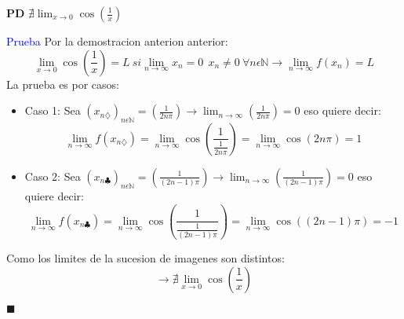 \documentclass{article}
\theoremstyle{mytheoremstyle}
\theoremstyle{mytheoremstyle}
\theoremstyle{myproblemstyle}
\begin{document}
\begin{itemize}
        \medskip
        $\mathbf{P} \mathbf{D}$
        \medskip
        $\nexists \lim_{x \to 0} \cos(\frac{1}{x})$
        
        
        \medskip
        {\textcolor{blue}{Prueba}} 
        \medskip
Por la demostracion anterion anterior:
\begin{equation}
 \lim_{x \to 0}\cos(\frac{1}{x})=\textit{L} \medspace si \lim_{n \to \infty}x_{n}=0 \medspace\medspace
x_{n}\neq 0 \medspace \forall n\epsilon \mathbb{N} \rightarrow \lim_{n\to \infty}
    f(x_{n})=\textit{L}
\end{equation}
La prueba es por casos:
\begin{itemize}
    \item {\textcolor{deepGreen}{Caso 1:}} 
\medskip
Sea $(x_{n\diamondsuit})_{n\epsilon \mathbb{N}}=(\frac{1}{2n\pi})\rightarrow 
\lim_{n \to \infty}(\frac{1}{2n\pi})=0$ eso quiere decir:
\begin{equation}
\lim_{n \to \infty}f(x_{n\diamondsuit})=\lim_{n \to \infty}\cos(\frac{1}{\frac{1}{2n\pi}})
=\lim_{n \to \infty}\cos(2n\pi)=1
   \end{equation}
   \item {\textcolor{deepGreen}{Caso 2:}} 
   \medskip
Sea $(x_{n\clubsuit})_{n\epsilon \mathbb{N}}=(\frac{1}{(2n-1)\pi})\rightarrow 
\lim_{n \to \infty}(\frac{1}{(2n-1)\pi})=0$ eso quiere decir:
\begin{equation}
\lim_{n \to \infty}f(x_{n\clubsuit })=\lim_{n \to \infty}\cos(\frac{1}{\frac{1}{(2n-1)\pi}})
=\lim_{n \to \infty}\cos((2n-1)\pi)=-1
   \end{equation}
\end{itemize}
Como los limites de la sucesion de imagenes son distintos:
\begin{equation}
    \rightarrow \nexists \lim_{x \to 0} \cos(\frac{1}{x})
 \end{equation}
 \begin{flushright} 
    $\blacksquare$
\end{flushright}
    \end{itemize}
\end{document}
